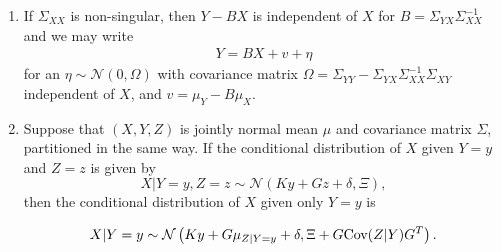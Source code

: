 \begin{lemma}
\begin{enumerate}
        \item If $\Sigma_{XX}$ is non-singular, then $Y - BX$ is independent of $X$ for $B = \Sigma_{YX} \Sigma_{XX}^{-1}$ and we may write
            \begin{align*}
            Y = BX + v + \eta
            \end{align*}
            for an $\eta \sim \mathcal N(0, \Omega)$ with covariance matrix $\Omega = \Sigma_{YY} - \Sigma_{YX}\Sigma_{XX}^{-1}\Sigma_{XY}$ independent of $X$, and $v = \mu_{Y} - B \mu_{X}$.
        \item Suppose that $(X,Y,Z)$ is jointly normal mean $\mu$ and covariance matrix $\Sigma$, partitioned in the same way. 
        If the conditional distribution of $X$ given $Y = y$ and $Z = z$ is given by 
        $$
        X | Y = y, Z = z \sim \mathcal N(Ky + Gz + \delta, \Xi),
        $$
        then the conditional distribution of $X$ given only $Y = y$ is
        
        $$
        X | Y = y \sim \mathcal N \left(Ky + G \mu_{Z| Y= y} + \delta, \Xi + G\text{Cov} (Z | Y) G^{T}\right).
        $$
        
    \end{enumerate}
    
\end{lemma}
